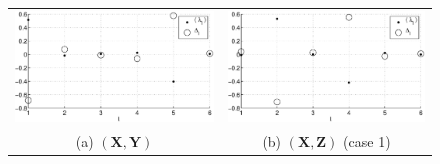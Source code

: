 \documentclass{article}[10pt]
\begin{document}
\begin{figure}[ht]
\begin{center}
\begin{tabular}{cc}
\includegraphics[scale=0.48]{NoisyMultiResponseExample_LandLCC_XY.eps} & \includegraphics[scale=0.48]{NoisyMultiResponseExample_LandLCC_XZ1.eps} \\
(a) $(\mathbf{X},\mathbf{Y})$ & (b) $(\mathbf{X},\mathbf{Z})$ (case 1)\\

\end{tabular}
\end{center}
\end{figure}
\end{document}
